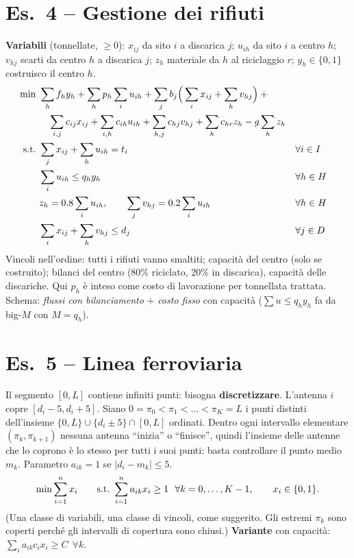 \section*{Es.\ 4 -- Gestione dei rifiuti}
\textbf{Variabili} (tonnellate, $\ge0$): $x_{ij}$ da sito $i$ a discarica $j$; $u_{ih}$ da sito $i$ a centro $h$; $v_{hj}$ scarti da centro $h$ a discarica $j$; $z_h$ materiale da $h$ al riciclaggio $r$; $y_h\in\{0,1\}$ costruisco il centro $h$.
\begin{align*}
\min\ & \sum_hf_hy_h+\sum_h p_h\sum_iu_{ih}+\sum_jb_j\Big(\sum_ix_{ij}+\sum_hv_{hj}\Big)+{}\\
&\quad\sum_{i,j}c_{ij}x_{ij}+\sum_{i,h}c_{ih}u_{ih}+\sum_{h,j}c_{hj}v_{hj}+\sum_hc_{hr}z_h-g\sum_hz_h\\
\text{s.t.}\ & \sum_jx_{ij}+\sum_hu_{ih}=t_i && \forall i\in I\\
& \sum_iu_{ih}\le q_hy_h && \forall h\in H\\
& z_h=0.8\sum_iu_{ih},\qquad \sum_jv_{hj}=0.2\sum_iu_{ih} && \forall h\in H\\
& \sum_ix_{ij}+\sum_hv_{hj}\le d_j && \forall j\in D
\end{align*}
Vincoli nell'ordine: tutti i rifiuti vanno smaltiti; capacità del centro (solo se costruito); bilanci del centro (80\% riciclato, 20\% in discarica), capacità delle discariche. Qui $p_h$ è inteso come costo di lavorazione per tonnellata trattata. Schema: \emph{flussi con bilanciamento} + \emph{costo fisso} con capacità ($\sum u\le q_hy_h$ fa da big-$M$ con $M=q_h$).

\section*{Es.\ 5 -- Linea ferroviaria}
Il segmento $[0,L]$ contiene infiniti punti: bisogna \textbf{discretizzare}. L'antenna $i$ copre $[d_i-5,d_i+5]$. Siano $0=\pi_0<\pi_1<\dots<\pi_K=L$ i punti distinti dell'insieme $\{0,L\}\cup\{d_i\pm5\}\cap[0,L]$ ordinati. Dentro ogni intervallo elementare $(\pi_k,\pi_{k+1})$ nessuna antenna ``inizia'' o ``finisce'', quindi l'insieme delle antenne che lo coprono è lo stesso per tutti i suoi punti: basta controllare il punto medio $m_k$. Parametro $a_{ik}=1$ se $|d_i-m_k|\le5$.
\[ \min\sum_{i=1}^nx_i\qquad\st\ \sum_{i=1}^na_{ik}x_i\ge1\ \ \forall k=0,\dots,K-1,\qquad x_i\in\{0,1\}. \]
(Una classe di variabili, una classe di vincoli, come suggerito. Gli estremi $\pi_k$ sono coperti perché gli intervalli di copertura sono chiusi.)
\textbf{Variante} con capacità: $\sum_ia_{ik}c_ix_i\ge C\ \ \forall k$.

